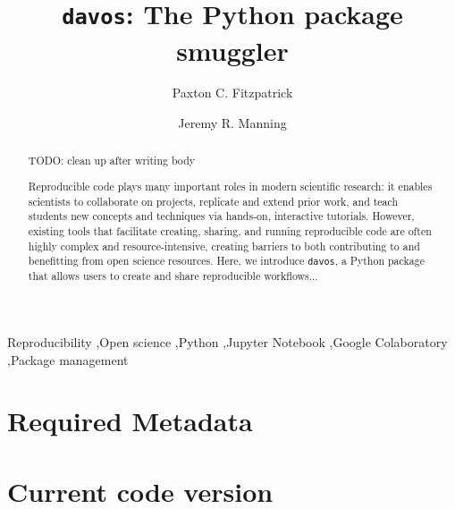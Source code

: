 \documentclass[preprint,12pt, a4paper]{elsarticle}
\newcommand{\comment}[1]{}
\begin{document}
\begin{frontmatter}

\title{\texttt{davos}: The Python package smuggler}
\author{Paxton C. Fitzpatrick}
\author{Jeremy R. Manning}
\address{Department of Psychological and Brain Sciences\\Dartmouth College, Hanover, NH 03755}


\begin{abstract}

TODO: clean up after writing body

Reproducible code plays many important roles in modern scientific research: it enables scientists to collaborate on projects,\comment{parallelize data collection across multiple sites or machines} replicate and extend prior work, and teach students new concepts and techniques via hands-on, interactive tutorials.
However, existing tools that facilitate creating, sharing, and running reproducible code are often highly complex and resource-intensive, creating barriers to both contributing to and benefitting from open science resources.
Here, we introduce \texttt{davos}, a Python package that allows users to create and share reproducible workflows...

\end{abstract}


\begin{keyword}
Reproducibility \sep Open science \sep Python \sep Jupyter Notebook \sep Google Colaboratory \sep Package management
\end{keyword}

\end{frontmatter}


\section*{Required Metadata}

\section*{Current code version}
\end{document}
